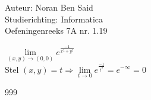\documentclass[a4paper]{article}
\begin{document}
\noindent \large Auteur: Noran Ben Said\\
\noindent \large Studierichting: Informatica\\
\noindent \large Oefeningenreeks 7A nr. 1.19 \\

\medskip
\normalsize

$ \lim\limits_{\left(x,y\right) \to \left(0,0\right) } e^{\tfrac{-1}{x^2+y^2}}$\\

Stel $\left(x,y\right) = t \Rightarrow \lim\limits_{t \to 0 } e^{\tfrac{-1}{t^2}} = e ^{-\infty} = 0$



\begin{thebibliography}{999}
\end{thebibliography}
\end{document}

